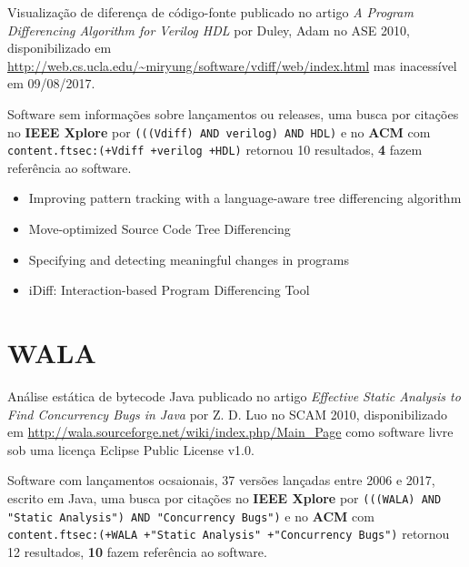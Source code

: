 Visualização de diferença de código-fonte
publicado no artigo {\it A Program Differencing Algorithm for Verilog HDL}
por Duley, Adam
no ASE 2010,
disponibilizado em \url{http://web.cs.ucla.edu/~miryung/software/vdiff/web/index.html}
mas inacessível em 09/08/2017.

Software sem informações sobre lançamentos ou releases,
uma busca por citações no {\bf IEEE Xplore} por
\texttt{(((Vdiff) AND verilog) AND HDL)}
e no {\bf ACM} com
\texttt{content.ftsec:(+Vdiff +verilog +HDL)}
retornou
10 resultados,
{\bf 4} fazem referência ao software.

\begin{itemize}
\item Improving pattern tracking with a language-aware tree differencing algorithm
\item Move-optimized Source Code Tree Differencing
\item Specifying and detecting meaningful changes in programs
\item iDiff: Interaction-based Program Differencing Tool
\end{itemize}

\section{WALA}

Análise estática de bytecode Java
publicado no artigo {\it Effective Static Analysis to Find Concurrency Bugs in Java}
por Z. D. Luo
no SCAM 2010,
disponibilizado em \url{http://wala.sourceforge.net/wiki/index.php/Main_Page}
como software livre
sob uma licença Eclipse Public License v1.0.

Software com lançamentos ocsaionais,
37 versões lançadas
entre 2006 e 2017,
escrito em Java,
uma busca por citações no {\bf IEEE Xplore} por
\texttt{(((WALA) AND "Static Analysis") AND "Concurrency Bugs")}
e no {\bf ACM} com
\texttt{content.ftsec:(+WALA +"Static Analysis" +"Concurrency Bugs")}
retornou
12 resultados,
{\bf 10} fazem referência ao software.

